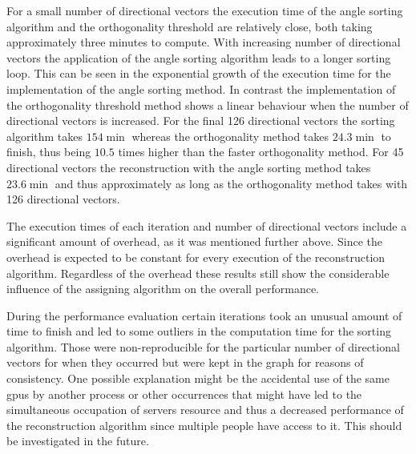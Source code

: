 For a small number of directional vectors the execution time of the angle sorting algorithm and the orthogonality threshold are relatively close, both taking approximately three minutes to compute. With increasing number of directional vectors the application of the angle sorting algorithm leads to a longer sorting loop. This can be seen in the exponential growth of the execution time for the implementation of the angle sorting method. In contrast the implementation of the orthogonality threshold method shows a linear behaviour when the number of directional vectors is increased. For the final 126 directional vectors the sorting algorithm takes $154 \min$ whereas the orthogonality method takes $24.3 \min$ to finish, thus being $10.5$ times higher than the faster orthogonality method. For 45 directional vectors the reconstruction with the angle sorting method takes $23.6 \min$ and thus approximately as long as the orthogonality method takes with 126 directional vectors.

The execution times of each iteration and number of directional vectors include a significant amount of overhead, as it was mentioned further above. Since the overhead is expected to be constant for every execution of the reconstruction algorithm. Regardless of the overhead these results still show the considerable influence of the assigning algorithm on the overall performance.

During the performance evaluation certain iterations took an unusual amount of time to finish and led to some outliers in the computation time for the sorting algorithm. Those were non-reproducible for the particular number of directional vectors for when they occurred but were kept in the graph for reasons of consistency. One possible explanation might be the accidental use of the same  \acp{gpu} by another process or other occurrences that might have led to the simultaneous occupation of servers resource and thus a decreased performance of the reconstruction algorithm since multiple people have access to it. This should be investigated in the future.


